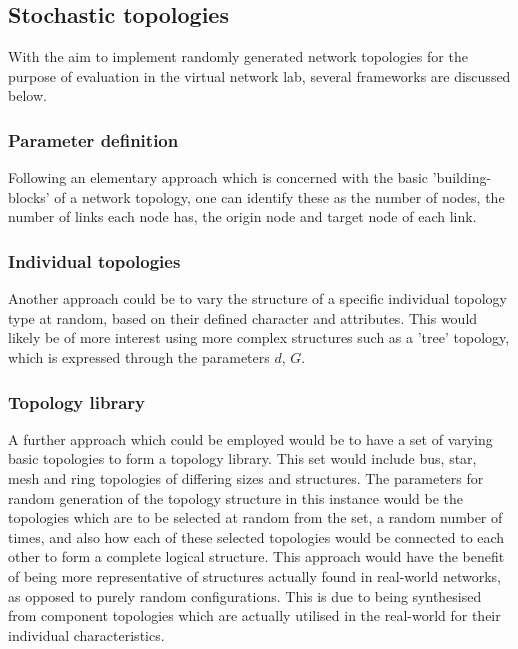 \subsection{Stochastic topologies}
With the aim to implement randomly generated network topologies for the purpose of evaluation in the virtual network lab, several frameworks are discussed below. 
\subsubsection{Parameter definition}
Following an elementary approach which is concerned with the basic 'building-blocks' of a network topology, one can identify these as the number of nodes, the number of links each node has, the origin node and target node of each link. 

\subsubsection{Individual topologies}
Another approach could be to vary the structure of a specific individual topology type at random, based on their defined character and attributes. This would likely be of more interest using more complex structures such as a 'tree' topology, which is expressed through the parameters $d$, $G$.

\subsubsection{Topology library}
A further approach which could be employed would be to have a set of varying basic topologies to form a topology library. This set would include bus, star, mesh and ring topologies of differing sizes and structures. The parameters for random generation of the topology structure in this instance would be the topologies which are to be selected at random from the set, a random number of times, and also how each of these selected topologies would be connected to each other to form a complete logical structure. This approach would have the benefit of being more representative of structures actually found in real-world networks, as opposed to purely random configurations. This is due to being synthesised from component topologies which are actually utilised in the real-world for their individual characteristics.

